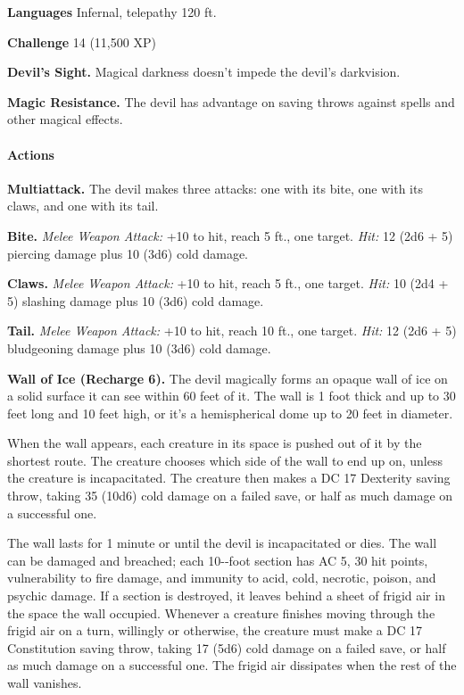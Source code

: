 \documentclass[
]{article}
\begin{document}
\textbf{Languages} Infernal, telepathy 120 ft.

\textbf{Challenge} 14 (11,500 XP)

\textbf{Devil's Sight.} Magical darkness doesn't impede the devil's
darkvision.

\textbf{Magic Resistance.} The devil has advantage on saving throws
against spells and other magical effects.

\hypertarget{actions-15}{%
\paragraph{Actions}\label{actions-15}}

\textbf{Multiattack.} The devil makes three attacks: one with its bite,
one with its claws, and one with its tail.

\textbf{Bite.} \emph{Melee Weapon Attack:} +10 to hit, reach 5 ft., one
target. \emph{Hit:} 12 (2d6 + 5) piercing damage plus 10 (3d6) cold
damage.

\textbf{Claws.} \emph{Melee Weapon Attack:} +10 to hit, reach 5 ft., one
target. \emph{Hit:} 10 (2d4 + 5) slashing damage plus 10 (3d6) cold
damage.

\textbf{Tail.} \emph{Melee Weapon Attack:} +10 to hit, reach 10 ft., one
target. \emph{Hit:} 12 (2d6 + 5) bludgeoning damage plus 10 (3d6) cold
damage.

\textbf{Wall of Ice (Recharge 6).} The devil magically forms an opaque
wall of ice on a solid surface it can see within 60 feet of it. The wall
is 1 foot thick and up to 30 feet long and 10 feet high, or it's a
hemispherical dome up to 20 feet in diameter.

When the wall appears, each creature in its space is pushed out of it by
the shortest route. The creature chooses which side of the wall to end
up on, unless the creature is incapacitated. The creature then makes a
DC 17 Dexterity saving throw, taking 35 (10d6) cold damage on a failed
save, or half as much damage on a successful one.

The wall lasts for 1 minute or until the devil is incapacitated or dies.
The wall can be damaged and breached; each 10-­‐foot section has AC 5,
30 hit points, vulnerability to fire damage, and immunity to acid, cold,
necrotic, poison, and psychic damage. If a section is destroyed, it
leaves behind a sheet of frigid air in the space the wall occupied.
Whenever a creature finishes moving through the frigid air on a turn,
willingly or otherwise, the creature must make a DC 17 Constitution
saving throw, taking 17 (5d6) cold damage on a failed save, or half as
much damage on a successful one. The frigid air dissipates when the rest
of the wall vanishes.
\end{document}
